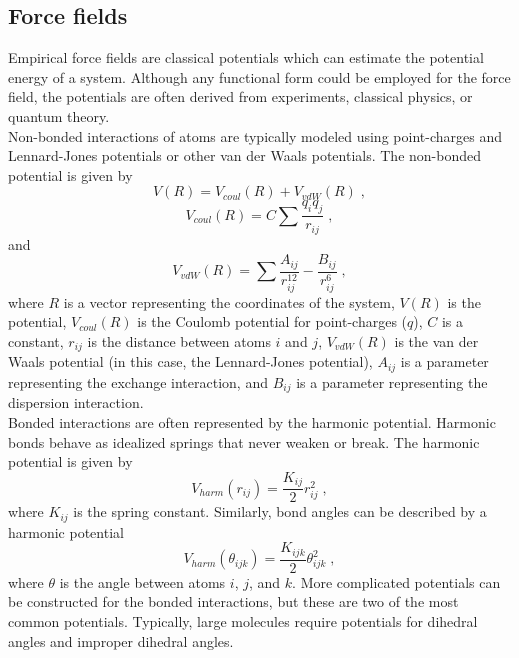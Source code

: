 \documentclass[12pt]{report}
\begin{document}
\subsection{Force fields}

Empirical force fields are classical potentials which can estimate the
potential energy of a system.
Although any functional form could be employed for the force field, the
potentials are often derived from experiments, classical physics, or quantum
theory. \\

Non-bonded interactions of atoms are typically modeled using point-charges
and Lennard-Jones potentials or other van der Waals potentials.
The non-bonded potential is given by
\begin{equation}
 V(R) = V_{coul}(R)+V_{vdW}(R) \; ,
\end{equation}
\begin{equation}
 V_{coul}(R) = C\sum \frac{q_iq_j}{r_{ij}} \; ,
\end{equation}
and
\begin{equation}
 V_{vdW}(R) = \sum \frac{A_{ij}}{r_{ij}^{12}}
              -\frac{B_{ij}}{r_{ij}^{6}} \; ,
\end{equation}
where $R$ is a vector representing the coordinates of the system, $V(R)$ is the
potential, $V_{coul}(R)$ is the Coulomb potential for point-charges ($q$),
$C$ is a constant, $r_{ij}$ is the distance between atoms $i$ and $j$,
$V_{vdW}(R)$ is the van der Waals potential (in this case, the Lennard-Jones
potential), $A_{ij}$ is a parameter representing the exchange interaction, and
$B_{ij}$ is a parameter representing the dispersion interaction. \\

Bonded interactions are often represented by the harmonic potential.
Harmonic bonds behave as idealized springs that never weaken or break.
The harmonic potential is given by
\begin{equation}
 V_{harm}(r_{ij}) = \frac{K_{ij}}{2}r_{ij}^2 \; ,
\end{equation}
where $K_{ij}$ is the spring constant.
Similarly, bond angles can be described by a harmonic potential
\begin{equation}
 V_{harm}(\theta_{ijk}) = \frac{K_{ijk}}{2}\theta_{ijk}^2 \; ,
\end{equation}
where $\theta$ is the angle between atoms $i$, $j$, and $k$.
More complicated potentials can be constructed for the bonded interactions,
but these are two of the most common potentials.
Typically, large molecules require potentials for dihedral angles and improper
dihedral angles. \\
\end{document}
